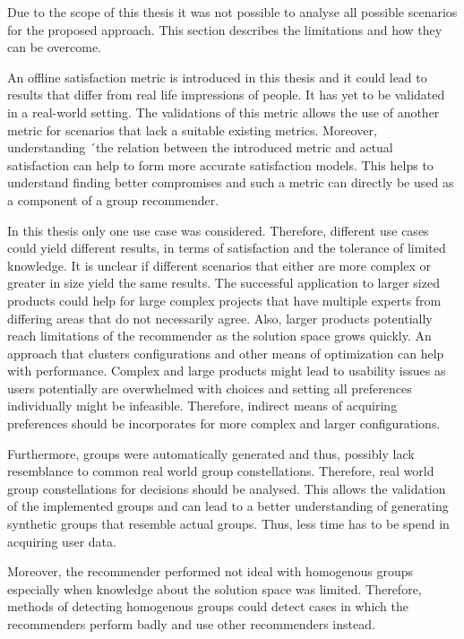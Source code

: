 Due to the scope of this thesis it was not possible to analyse all possible scenarios for the proposed approach. This section describes the limitations and how they can be overcome.

An offline satisfaction metric is introduced in this thesis and it could lead to results that differ from real life impressions of people. It has yet to be validated in a real-world setting. The validations of this metric allows the use of another metric for scenarios that lack a suitable existing metrics. Moreover, understanding ´the relation between the introduced metric and actual satisfaction can help to form more accurate satisfaction models. This helps to understand finding better compromises and such a metric can directly be used as a component of a group recommender.

In this thesis only one use case was considered. Therefore, different use cases could yield different results, in terms of satisfaction and the tolerance of limited knowledge. It is unclear if different scenarios that either are more complex or greater in size yield the same results. The successful application to larger sized products could help for large complex projects that have multiple experts from differing areas that do not necessarily agree. Also, larger products potentially reach limitations of the recommender as the solution space grows quickly. An approach that clusters configurations and other means of optimization can help with performance. Complex and large products might lead to usability issues as users potentially are overwhelmed with choices and setting all preferences individually might be infeasible. Therefore, indirect means of acquiring preferences should be incorporates for more complex and larger configurations. 

Furthermore, groups were automatically generated and thus, possibly lack resemblance to common real world group constellations. Therefore, real world group constellations for decisions should be analysed. This allows the validation of the implemented groups and can lead to a better understanding of generating synthetic groups that resemble actual groups. Thus, less time has to be spend in acquiring user data.

Moreover, the recommender performed not ideal with homogenous groups especially when knowledge about the solution space was limited. Therefore, methods of detecting homogenous groups could detect cases in which the recommenders perform badly and use other recommenders instead.

